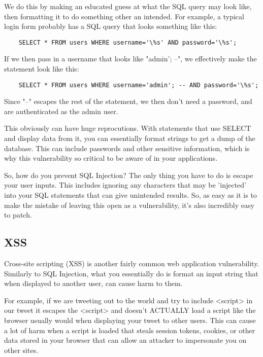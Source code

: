 \documentclass[12pt]{article}
\begin{document}
We do this by making an educated guess at what the SQL query may look like,
then formatting it to do something other an intended. For example, a typical
login form probably has a SQL query that looks something like this:

\begin{verbatim}
    SELECT * FROM users WHERE username='\%s' AND password='\%s';
\end{verbatim}

If we then pass in a username that looks like "admin'; --", we effectively
make the statement look like this:

\begin{verbatim}
    SELECT * FROM users WHERE username='admin'; -- AND password='\%s';
\end{verbatim}

Since "--" escapes the rest of the statement, we then don't need a password,
and are authenticated as the admin user.

This obviously can have huge reprocutions. With statements that use SELECT and
display data from it, you can essentially format strings to get a dump of the
database. This can include passwords and other sensitive information, which
is why this vulnerability so critical to be aware of in your applications.

So, how do you prevent SQL Injection? The only thing you have to do is escape
your user inputs. This includes ignoring any characters that may be 'injected'
into your SQL statements that can give unintended results. So, as easy as it
is to make the mistake of leaving this open as a vulnerability, it's also
incredibly easy to patch.

\subsection{XSS}

Cross-site scripting (XSS) is another fairly common web application
vulnerability. Similarly to SQL Injection, what you essentially do is format
an input string that when displayed to another user, can cause harm to them.

For example, if we are tweeting out to the world and try to include <script>
in our tweet it escapes the <script> and doesn't ACTUALLY load a script
like the browser usually would when displaying your tweet to other users. This
can cause a lot of harm when a script is loaded that steals session tokens,
cookies, or other data stored in your browser that can allow an attacker to
impersonate you on other sites. 
\end{document}
